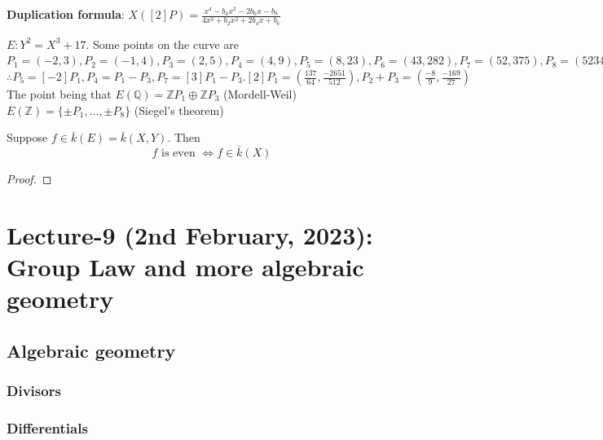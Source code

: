 \documentclass[oneside, 12pt, ]{scrbook}
\newcommand{\QQ}{\mathbb Q}
\newcommand{\ZZ}{\mathbb Z}
\newcommand{\ds}{\displaystyle}
\theoremstyle{theorem}
\begin{document}
\textbf{Duplication formula}: $X([2]P) = \ds{\frac{x^4 -b_{4}x^2 -2b_{6}x - b_{8}}{4x^3 + b_{2}x^2 + 2b_{4}x + b_{6}}}$

\begin{example}
$E: Y^2 = X^3 + 17$. Some points on the curve are $P_{1} = (-2,3), P_{2} = (-1,4), P_{3} = (2,5), P_{4} = (4,9) , P_{5}=(8,23), P_{6}= (43, 282), P_{7} = (52, 375), P_{8} = (5234, 378661)$ \\
$\therefore P_{5} = [-2]P_{1}, P_{4} = P_{1}-P_{3} , P_{7} = [3]P_{1} - P_{3}. [2]P_{1} = \left( \frac{137}{64}, \frac{-2651}{512} \right) , P_{2} + P_{3} = \left(\frac{-8}{9}, \frac{-169}{27} \right)$ \\

The point being that $E(\QQ) = \ZZ P_{1} \oplus \ZZ P_{3}$ (Mordell-Weil) \\
$E(\ZZ) = \{\pm P_{1}, \hdots , \pm P_{8}\}$ (Siegel's theorem)
\end{example}

\begin{corollary}
Suppose $f\in \bar{k}(E) = \bar{k}(X,Y)$. Then $$f \text{ is even } \Leftrightarrow f \in \bar{k}(X)$$
\end{corollary}

\begin{proof}

\end{proof}





\chapter{Lecture-9 (2nd February, 2023): Group Law and more algebraic geometry}

\section{Algebraic geometry}

\subsection{Divisors}

\subsection{Differentials}
\end{document}
